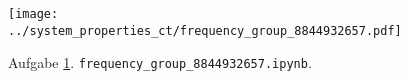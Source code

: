 \begin{figure}[h]
\centering
\texttt{[image: ../system\_properties\_ct/frequency\_group\_8844932657.pdf]}
\caption{Aufgabe \ref{fig:frequency_group_8844932657}. \texttt{frequency\_group\_8844932657.ipynb}.}
\label{fig:frequency_group_8844932657}
\end{figure}




